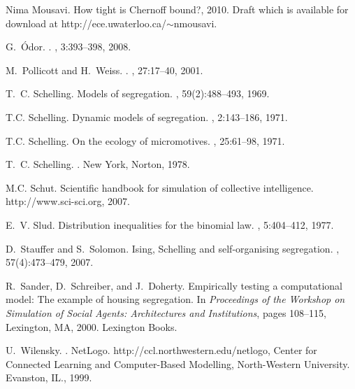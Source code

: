 \documentclass[11pt]{article}
\theoremstyle{plain}
\numberwithin{equation}{subsection}
\begin{document}
\begin{thebibliography}{CMGP13}
Nima Mousavi.
\newblock How tight is {C}hernoff bound?, 2010.
\newblock Draft which is available for download at
  http://ece.uwaterloo.ca/$\sim$nmousavi.

G.\ \'{O}dor.
.
, 3:393--398, 2008.

M.\ Pollicott and H.\ Weiss.
.
, 27:17--40, 2001.

T.~C. Schelling.
\newblock Models of segregation.
, 59(2):488--493, 1969.

T.C. Schelling.
\newblock Dynamic models of segregation.
, 2:143--186, 1971.

T.C. Schelling.
\newblock On the ecology of micromotives.
, 25:61--98, 1971.

T.~C. Schelling.
.
\newblock New York, Norton, 1978.

M.C. Schut.
\newblock Scientific handbook for simulation of collective intelligence.
\newblock http://www.sci-sci.org, 2007.

E.~V. Slud.
\newblock Distribution inequalities for the binomial law.
, 5:404--412, 1977.

D.~Stauffer and S.~Solomon.
\newblock Ising, {S}chelling and self-organising segregation.
, 57(4):473--479, 2007.

R.~Sander, D.~Schreiber, and J.~Doherty.
\newblock Empirically testing a computational model: The example of housing
  segregation.
\newblock In {\em Proceedings of the Workshop on Simulation of Social Agents:
  Architectures and Institutions}, pages 108--115, Lexington, MA, 2000.
  Lexington Books.

U.~Wilensky.
.
\newblock NetLogo. http://ccl.northwestern.edu/netlogo, Center for Connected
  Learning and Computer-Based Modelling, North-Western University. Evanston,
  IL., 1999.


\end{thebibliography}
\end{document}
